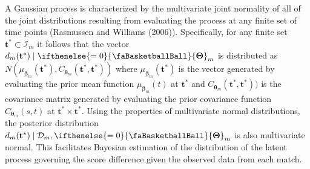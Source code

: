 \documentclass[
  11pt,
]{svjour3}
\theoremstyle{nonumberplain}
\begin{document}
A Gaussian process is characterized by the multivariate joint normality
of all of the joint distributions resulting from evaluating the process
at any finite set of time points (Rasmussen and Williams (2006)).
Specifically, for any finite set
\(\mathbf{t}^\ast \subset \mathcal{I}_m\) it follows that the vector
\(d_m(\mathbf{t}^\ast) \mid \ifthenelse{\value{bbsym4theta}=0}{\text{\faBasketballBall}}{\mathbf{\Theta}}_m\)
is distributed as
\(N(\mu_{\bm{\beta}_m}(\mathbf{t}^\ast), C_{\bm{\theta}_m}(\mathbf{t}^\ast, \mathbf{t}^\ast))\)
where \(\mu_{\bm{\beta}_m}(\mathbf{t}^\ast)\) is the vector generated by
evaluating the prior mean function \(\mu_{\bm{\beta}_m}(t)\) at
\(\mathbf{t}^\ast\) and
\(C_{\bm{\theta}_m}(\mathbf{t}^\ast, \mathbf{t}^\ast))\) is the
covariance matrix generated by evaluating the prior covariance function
\(C_{\bm{\theta}_m}(s,t)\) at
\(\mathbf{t}^\ast \times \mathbf{t}^\ast\). Using the properties of
multivariate normal distributions, the posterior distribution
\(d_m(\mathbf{t}^\ast) \mid \mathcal{D}_m, \ifthenelse{\value{bbsym4theta}=0}{\text{\faBasketballBall}}{\mathbf{\Theta}}_m\)
is also multivariate normal. This facilitates Bayesian estimation of the
distribution of the latent process governing the score difference given
the observed data from each match.
\end{document}
